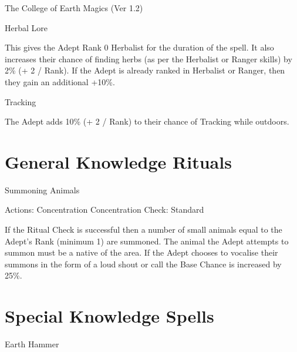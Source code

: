 \begin{Chapter}{The College of Earth Magics (Ver 1.2)}
\begin{spell}[G-10]{Herbal Lore }
\begin{effects}
This gives the Adept Rank 0 Herbalist for 
the  duration  of  the  spell.  It  also  increases  their 
chance  of  finding  herbs  (as  per  the  Herbalist  or 
Ranger skills) by 2\% (+ 2 / Rank). If the Adept is 
already  ranked  in  Herbalist  or  Ranger,  then  they 
gain an additional +10\%. 

\end{effects}
\end{spell}

\begin{spell}[G-11]{Tracking }

\begin{effects}
The Adept adds 10\% (+ 2 / Rank) to their 
chance of Tracking while outdoors. 


\end{effects}
\end{spell}

\section{General Knowledge Rituals}

\begin{ritual}[Q-1]{Summoning Animals }

Actions: Concentration 
Concentration Check: Standard 
\begin{effects}
 If  the  Ritual  Check  is  successful  then  a 
number of small animals equal to the Adept’s Rank 
(minimum 1) are summoned. The animal the Adept 
attempts to summon must be a native of the area. If 
the Adept chooses to vocalise their summons in the 
form  of  a  loud  shout  or  call  the  Base  Chance  is 
increased by 25\%. 


\end{effects}
\end{ritual}

\section{Special Knowledge Spells}

\begin{spell}[S-1]{Earth Hammer }


\end{spell}
\end{Chapter}

